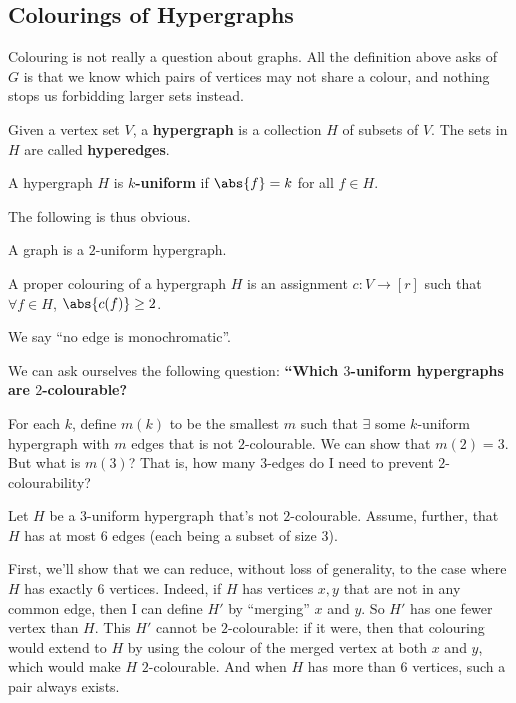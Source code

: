 \subsection{Colourings of Hypergraphs}

Colouring is not really a question about graphs. All the definition above asks of $G$ is that we know which pairs of vertices may not share a colour, and nothing stops us forbidding larger sets instead.

\begin{boxdefinition}[Hypergraph]
    Given a vertex set $V$, a \textbf{hypergraph} is a collection $H$ of subsets of $V$. The sets in $H$ are called \textbf{hyperedges}.
\end{boxdefinition}

\begin{boxdefinition}[Uniformity]
    A hypergraph $H$ is \textbf{$k$-uniform} if $\abs{f} = k$ for all $f \in H$.
\end{boxdefinition}

The following is thus obvious.

\begin{boxproposition}
    A graph is a $2$-uniform hypergraph.
\end{boxproposition}

\begin{boxdefinition}
A proper colouring of a hypergraph $H$ is an assignment $c : V \to [r]$ such that $\forall f \in H$, $\abs{c(f)} \geq 2$.
\end{boxdefinition}

We say ``no edge is monochromatic''.

We can ask ourselves the following question: \textbf{``Which $3$-uniform hypergraphs are $2$-colourable?}

For each $k$, define $m(k)$ to be the smallest $m$ such that $\exists$ some $k$-uniform hypergraph with $m$ edges that is not $2$-colourable. We can show that $m(2) = 3$. But what is $m(3)$? That is, how many $3$-edges do I need to prevent $2$-colourability?

Let $H$ be a $3$-uniform hypergraph that's not $2$-colourable. Assume, further, that $H$ has at most $6$ edges (each being a subset of size $3$).

First, we'll show that we can reduce, without loss of generality, to the case where $H$ has exactly $6$ vertices. Indeed, if $H$ has vertices $x, y$ that are not in any common edge, then I can define $H'$ by ``merging'' $x$ and $y$. So $H'$ has one fewer vertex than $H$. This $H'$ cannot be $2$-colourable: if it were, then that colouring would extend to $H$ by using the colour of the merged vertex at both $x$ and $y$, which would make $H$ $2$-colourable. And when $H$ has more than $6$ vertices, such a pair always exists.

